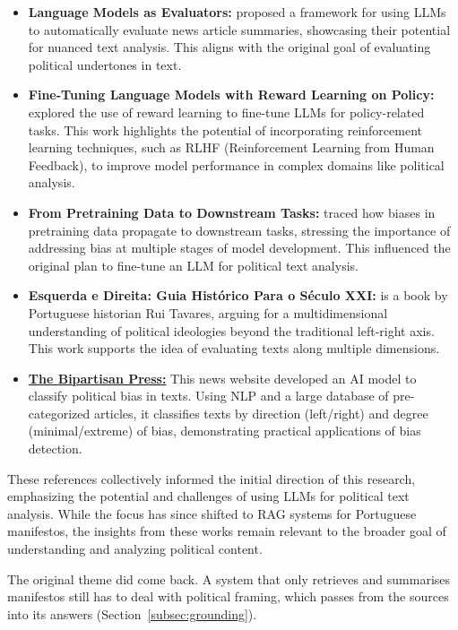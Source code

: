 \begin{itemize}
\item \textbf{Language Models as Evaluators:} \cite{HelgessonHallstrom1787721} proposed a framework for using LLMs to automatically evaluate news article summaries, showcasing their potential for nuanced text analysis. This aligns with the original goal of evaluating political undertones in text.
\item \textbf{Fine-Tuning Language Models with Reward Learning on Policy:} \cite{lang2024finetuninglanguagemodelsreward} explored the use of reward learning to fine-tune LLMs for policy-related tasks. This work highlights the potential of incorporating reinforcement learning techniques, such as RLHF (Reinforcement Learning from Human Feedback), to improve model performance in complex domains like political analysis.
\item \textbf{From Pretraining Data to Downstream Tasks:} \cite{pretraining-political-bias} traced how biases in pretraining data propagate to downstream tasks, stressing the importance of addressing bias at multiple stages of model development. This influenced the original plan to fine-tune an LLM for political text analysis.
\item \textbf{Esquerda e Direita: Guia Histórico Para o Século XXI:} \cite{tavares2016esquerda} is a book by Portuguese historian Rui Tavares, arguing for a multidimensional understanding of political ideologies beyond the traditional left-right axis. This work supports the idea of evaluating texts along multiple dimensions.
\item \href{https://www.thebipartisanpress.com/}{\textbf{The Bipartisan Press:}} This news website developed an AI model to classify political bias in texts. Using NLP and a large database of pre-categorized articles, it classifies texts by direction (left/right) and degree (minimal/extreme) of bias, demonstrating practical applications of bias detection.
\end{itemize}

These references collectively informed the initial direction of this research, emphasizing the potential and challenges of using LLMs for political text analysis. While the focus has since shifted to RAG systems for Portuguese manifestos, the insights from these works remain relevant to the broader goal of understanding and analyzing political content.

The original theme did come back. A system that only retrieves and
summarises manifestos still has to deal with political framing, which passes
from the sources into its answers (Section~\ref{subsec:grounding}).
